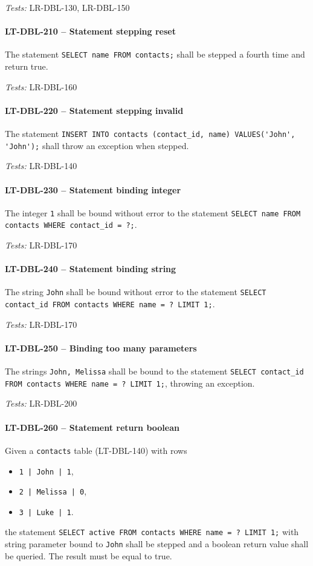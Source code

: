 \textit{Tests: } LR-DBL-130, LR-DBL-150

\paragraph{LT-DBL-210 -- Statement stepping reset}
The statement \lstinline{SELECT name FROM contacts;} shall
be stepped a fourth time and return true.

\textit{Tests: } LR-DBL-160

\paragraph{LT-DBL-220 -- Statement stepping invalid}
The statement \lstinline{INSERT INTO contacts (contact_id, name) VALUES('John', 'John');}
shall throw an exception when stepped.

\textit{Tests: } LR-DBL-140

\paragraph{LT-DBL-230 -- Statement binding integer}
The integer \lstinline{1} shall be bound without error to the statement
\lstinline{SELECT name FROM contacts WHERE contact_id = ?;}.

\textit{Tests: } LR-DBL-170

\paragraph{LT-DBL-240 -- Statement binding string}
The string \lstinline{John} shall be bound without error to the statement
\lstinline{SELECT contact_id FROM contacts WHERE name = ? LIMIT 1;}.

\textit{Tests: } LR-DBL-170

\paragraph{LT-DBL-250 -- Binding too many parameters}
The strings \lstinline{John, Melissa} shall be bound to the statement
\lstinline{SELECT contact_id FROM contacts WHERE name = ? LIMIT 1;},
throwing an exception.

\textit{Tests: } LR-DBL-200

\paragraph{LT-DBL-260 -- Statement return boolean}
Given a \lstinline{contacts} table (LT-DBL-140)
with rows
\begin{itemize}
\item \lstinline{1 | John | 1},
\item \lstinline{2 | Melissa | 0},
\item \lstinline{3 | Luke | 1}.
\end{itemize}
the statement \lstinline{SELECT active FROM contacts WHERE name = ? LIMIT 1;}
with string parameter bound to \lstinline{John} shall be stepped and
a boolean return value shall be queried. The result must be equal to true.


